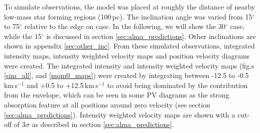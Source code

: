 \documentclass[useAMS,usenatbib]{mn2e}
\begin{document}
To simulate observations, the model was placed at roughly the distance of nearby low-mass star forming regions (100$\,$pc). The inclination angle was varied from 15$^\circ$ to 75$^\circ$ relative to the edge on case.  In the following, we will show the 30$^\circ$ case, while the 15$^\circ$ is discussed in section \ref{sec:alma_predictions}. Other inclinations are shown in appendix \ref{sec:other_inc}. From these simulated observations, integrated intensity maps, intensity weighted velocity maps and position velocity diagrams were created. The integrated intensity and  intensity weighted velocity maps (fig.s \ref{sim_all}, and \ref{mom0_maps}) were created by integrating between -12.5 to -0.5$\,$km$\,$s$^{-1}$ and +0.5 to +12.5$\,$km$\,$s$^{-1}$ to avoid being dominated by the contribution from the envelope, which can be seen in some PV diagrams as the strong absorption feature at all positions around zero velocity (see section \ref{sec:alma_predictions}). Intensity weighted velocity maps are shown with a cut-off of 3$\sigma$ as described in section \ref{sec:alma_predictions}.\smallskip
\end{document}
